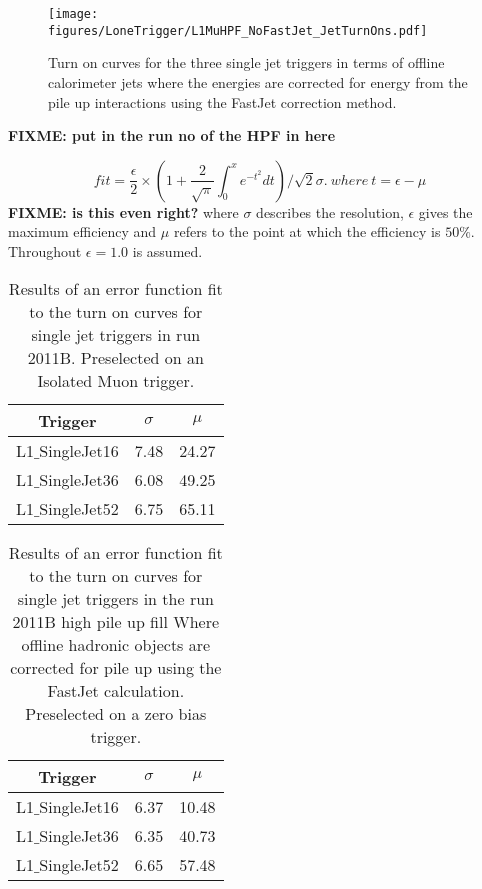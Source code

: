 \begin{figure}[ht]
  \centering
    \texttt{[image: figures/LoneTrigger/L1MuHPF\_NoFastJet\_JetTurnOns.pdf]}
  \caption{Turn on curves for the three \Lone single jet triggers in terms of 
  offline \AK calorimeter jets where the energies are corrected for energy from 
  the pile up interactions using the FastJet correction method.}
  \label{fig:figures_LoneTrigger_L1MuHPF_NoFastJet_JetTurnOns}
\end{figure}

\textbf{FIXME: put in the run no of the HPF in here} 


\begin{equation}
    fit = \frac{\epsilon}{2} \times (1 + 
    \frac{2}{\sqrt{\pi}}\int^{x}_{0}e^{-t^{2}}dt)/\sqrt{2}\sigma. ~ where~ t = 
    \epsilon - \mu
\label{eqn:erf}
\end{equation}
\textbf{FIXME: is this even right?}
where $\sigma$ describes the resolution, $\epsilon$ gives the maximum 
efficiency and $\mu$ refers to the point at which the efficiency is $50\%$.
Throughout $\epsilon = 1.0 $ is assumed. 
\begin{table}[ht]
\begin{tabular}{|c|c|c|}
\hline
Trigger & $\sigma$ & $\mu$\\
\hline
L1$\_$SingleJet16 & 7.48 & 24.27 \\
\hline
L1$\_$SingleJet36 & 6.08 & 49.25 \\
\hline
L1$\_$SingleJet52 & 6.75 & 65.11 \\
\hline
\end{tabular}
\caption{Results of an error function fit to the turn on curves for \Lone 
single jet triggers in run 2011B. Preselected on an Isolated Muon trigger.}
\label{tab:2011B_performance}
\end{table}


\begin{table}[ht]
\begin{tabular}{|c|c|c|}
\hline
Trigger & $\sigma$ & $\mu$\\
\hline
L1$\_$SingleJet16 & 6.37 & 10.48 \\
\hline
L1$\_$SingleJet36 & 6.35 & 40.73 \\
\hline
L1$\_$SingleJet52 & 6.65 & 57.48 \\
\hline
\end{tabular}
\caption{Results of an error function fit to the turn on curves for \Lone 
single jet triggers in the run 2011B high pile up fill Where offline hadronic 
objects are corrected for pile up using the FastJet calculation. Preselected on 
a zero bias trigger.}
\label{tab:2011B_HighPU_FastJet}
\end{table}


